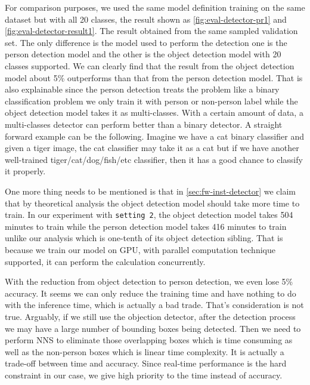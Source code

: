 For comparison purposes, we used the same model definition training on the same
dataset but with all 20 classes, the result shown as
\autoref{fig:eval-detector-pr1} and \autoref{fig:eval-detector-result1}. The
result obtained from the same sampled validation set. The only difference is the
model used to perform the detection one is the person detection model and the
other is the object detection model with 20 classes supported. We can clearly
find that the result from the object detection model about 5\% outperforms than
that from the person detection model.
That is also explainable since the person detection treats the problem like a
binary classification problem we only train it with person or non-person label
while the object detection model takes it as multi-classes. With a certain amount
of data, a multi-classes detector can perform better than a binary detector.
A straight forward example can be the following. Imagine we have a cat binary classifier
and given a tiger image, the cat classifier may take it as a cat but if we have
another well-trained tiger/cat/dog/fish/etc classifier, then it has a good
chance to classify it properly.

One more thing needs to be mentioned is that in \autoref{sec:fw-inst-detector}
we claim that by theoretical analysis the object detection model should take
more time to train. In our experiment with \texttt{setting 2},
the object detection model takes 504
minutes to train while the person detection model takes 416 minutes to train
unlike our analysis which is one-tenth of its object detection sibling.
That is because we train our model on GPU, with parallel computation
technique supported, it can perform the calculation concurrently.

With the reduction from object detection to person detection, we even lose 5\% 
accuracy. It seems we can only reduce the training time and have nothing to do 
with the inference time, which is actually a bad trade. That's consideration is 
not true. Arguably, if we still use the objection detector, after the detection 
process we may have a large number of bounding boxes being detected. Then we 
need to perform NNS to eliminate those overlapping boxes which is time 
consuming as well as the non-person boxes which is linear time complexity. It
is actually a trade-off between time and accuracy.
Since real-time performance is the hard constraint in our case, we give high
priority to the time instead of accuracy.

